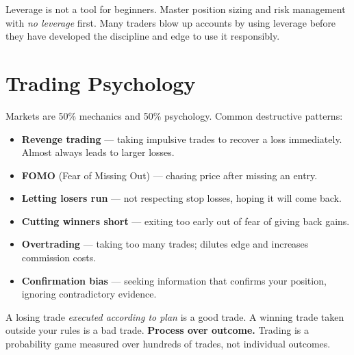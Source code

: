 \begin{warningbox}
Leverage is not a tool for beginners. Master position sizing and risk management
with \emph{no leverage} first. Many traders blow up accounts by using leverage
before they have developed the discipline and edge to use it responsibly.
\end{warningbox}

\section{Trading Psychology}

Markets are 50\% mechanics and 50\% psychology. Common destructive patterns:

\begin{itemize}
  \item \textbf{Revenge trading} — taking impulsive trades to recover a loss immediately.
        Almost always leads to larger losses.
  \item \textbf{FOMO} (Fear of Missing Out) — chasing price after missing an entry.
  \item \textbf{Letting losers run} — not respecting stop losses, hoping it will come back.
  \item \textbf{Cutting winners short} — exiting too early out of fear of giving back gains.
  \item \textbf{Overtrading} — taking too many trades; dilutes edge and increases commission costs.
  \item \textbf{Confirmation bias} — seeking information that confirms your position,
        ignoring contradictory evidence.
\end{itemize}

\begin{notebox}
A losing trade \emph{executed according to plan} is a good trade. A winning trade taken
outside your rules is a bad trade. \textbf{Process over outcome.} Trading is a probability game
measured over hundreds of trades, not individual outcomes.
\end{notebox}
